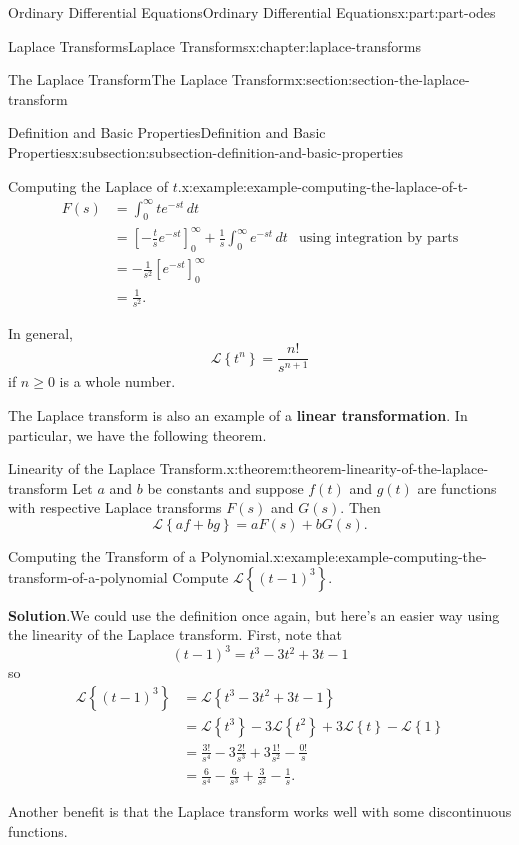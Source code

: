 \documentclass[oneside,10pt,]{book}
\newcommand{\blocktitlefont}{\relax}
\newcommand{\terminology}[1]{\textbf{#1}}
\numberwithin{equation}{part}
\newcommand{\Int}[2]{\int_{#1}^{#2}}
\newcommand{\Laplace}[1]{\mathcal{L}\left\{#1\right\}}
\newcommand{\amp}{&}
\begin{document}
\begin{partptx}{Ordinary Differential Equations}{}{Ordinary Differential Equations}{}{}{x:part:part-odes}
\begin{chapterptx}{Laplace Transforms}{}{Laplace Transforms}{}{}{x:chapter:laplace-transforms}
\begin{sectionptx}{The Laplace Transform}{}{The Laplace Transform}{}{}{x:section:section-the-laplace-transform}
\begin{subsectionptx}{Definition and Basic Properties}{}{Definition and Basic Properties}{}{}{x:subsection:subsection-definition-and-basic-properties}
\begin{example}{Computing the Laplace of \(t\).}{x:example:example-computing-the-laplace-of-t-}
\begin{align*}
F(s) \amp= \Int{0}{\infty}te^{-st}\,dt\\
\amp= \left[-\frac{t}{s}e^{-st}\right]_{0}^{\infty} + \frac{1}{s}\Int{0}{\infty}e^{-st}\,dt \amp\text{using integration by parts}\\
\amp= -\frac{1}{s^{2}}\left[e^{-st}\right]_{0}^{\infty}\\
\amp= \frac{1}{s^{2}}\text{.}
\end{align*}
%
\end{example}
In general,%
\begin{equation*}
\mathcal{L}\left\{t^{n}\right\} = \frac{n!}{s^{n+1}}
\end{equation*}
if \(n\geq0\) is a whole number.%
\par
The Laplace transform is also an example of a \terminology{linear transformation}. In particular, we have the following theorem.%
\begin{theorem}{Linearity of the Laplace Transform.}{}{x:theorem:theorem-linearity-of-the-laplace-transform}%
Let \(a\) and \(b\) be constants and suppose \(f(t)\) and \(g(t)\) are functions with respective Laplace transforms \(F(s)\) and \(G(s)\). Then%
\begin{equation*}
\Laplace{af+bg} = aF(s)+bG(s).
\end{equation*}
%
\end{theorem}
\begin{example}{Computing the Transform of a Polynomial.}{x:example:example-computing-the-transform-of-a-polynomial}%
Compute \(\Laplace{(t-1)^{3}}\).%
\par\smallskip%
\noindent\textbf{\blocktitlefont Solution}.\hypertarget{g:solution:idp105548781482528}{}\quad{}We could use the definition once again, but here's an easier way using the linearity of the Laplace transform. First, note that%
\begin{equation*}
(t-1)^{3} = t^{3} - 3t^{2} +3t - 1
\end{equation*}
so%
\begin{align*}
\Laplace{(t-1)^{3}} \amp= \Laplace{t^{3}-3t^{2}+3t-1}\\
\amp= \Laplace{t^{3}} - 3\Laplace{t^{2}} +3\Laplace{t} - \Laplace{1}\\
\amp= \frac{3!}{s^{4}} - 3\frac{2!}{s^{3}} + 3\frac{1!}{s^{2}} - \frac{0!}{s}\\
\amp= \frac{6}{s^{4}} - \frac{6}{s^{3}} + \frac{3}{s^{2}} - \frac{1}{s}\text{.}
\end{align*}
%
\end{example}
Another benefit is that the Laplace transform works well with some discontinuous functions.%

\end{subsectionptx}
\end{sectionptx}
\end{chapterptx}
\end{partptx}
\end{document}
